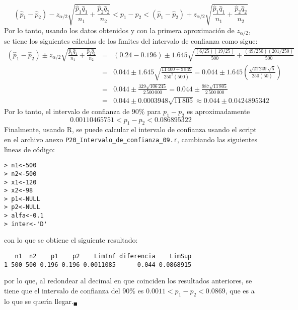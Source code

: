 \begin{solucion}
 \begin{equation*}
  \left( \hat{p}_1 - \hat{p}_2 \right) - z_{\alpha/2}\sqrt{\frac{\hat{p}_1\hat{q}_1}{n_1} + \frac{\hat{p}_2\hat{q}_2}{n_2}} < p_1 - p_2 < \left( \hat{p}_1 - \hat{p}_2 \right) + z_{\alpha/2}\sqrt{\frac{\hat{p}_1\hat{q}_1}{n_1} + \frac{\hat{p}_2\hat{q}_2}{n_2}}
 \end{equation*}
 Por lo tanto, usando los datos obtenidos y con la primera aproximaci\'on de $z_{\alpha/2}$, se tiene los siguientes c\'alculos de los l\'{\i}mites del intervalo de confianza como sigue:
 \begin{eqnarray*}
  \left( \hat{p}_1 - \hat{p}_2 \right) \pm z_{\alpha/2}\sqrt{\frac{\hat{p}_1\hat{q}_1}{n_1} + \frac{\hat{p}_2\hat{q}_2}{n_2}} & = & ( 0.24 - 0.196 ) \pm 1.645\sqrt{\frac{(6/25)(19/25)}{500} + \frac{(49/250)(201/250)}{500}} \\
  & = & 0.044 \pm 1.645\sqrt{\frac{11\,400 + 9\,849}{250^2(500)}} = 0.044 \pm 1.645\left( \frac{\sqrt{21\,249}\sqrt{5}}{250(50)} \right) \\
  & = & 0.044 \pm \frac{329\sqrt{106\,245}}{2\,500\,000} = 0.044 \pm \frac{987\sqrt{11\,805}}{2\,500\,000} \\
  & = & 0.044 \pm 0.0003948\sqrt{11\,805} \approx 0.044 \pm 0.0424895342
 \end{eqnarray*}
 Por lo tanto, el intervalo de confianza de $90\%$ para $p_1 - p_2$ es aproximadamente
 \begin{equation*}
  0.00110465751 < p_1 - p_2 < 0.086895322
 \end{equation*}
 Finalmente, usando R, se puede calcular el intervalo de confianza usando el script en el archivo anexo \texttt{P20\_Intervalo\_de\_confianza\_09.r}, cambiando las siguientes l\'{\i}neas de c\'odigo:
 \begin{verbatim}
> n1<-500
> n2<-500
> x1<-120
> x2<-98
> p1<-NULL
> p2<-NULL
> alfa<-0.1
> inter<-'D'
 \end{verbatim}
 \vspace{-0.5cm}
 con lo que se obtiene el siguiente resultado:
 \begin{verbatim}
   n1  n2    p1    p2    LimInf diferencia    LimSup
1 500 500 0.196 0.196 0.0011085      0.044 0.0868915
 \end{verbatim}
 \vspace{-0.5cm}
 por lo que, al redondear al decimal en que coinciden los resultados anteriores, se tiene que el intervalo de confianza del $90\%$ es $0.0011 < p_1 - p_2 < 0.0869$, que es a lo que se quer\'{\i}a llegar.${}_{\blacksquare}$
\end{solucion}
